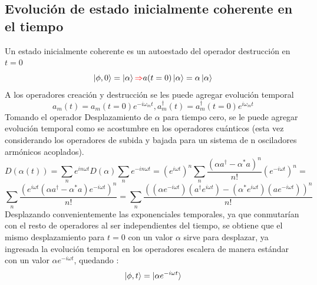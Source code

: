\documentclass{book}
\begin{document}
    \subsection{Evolución de estado inicialmente coherente en el tiempo} Un estado inicialmente coherente es un autoestado del operador destrucción en ${t=0}$
    \begin{equation}{ \ket{\phi,0}=\ket{\alpha} \textcolor{red}{\Rightarrow} a(t=0)\ket{\alpha}=\alpha\ket{\alpha} }\end{equation} A los operadores creación y destrucción se les puede agregar evolución temporal
    \begin{equation}{ a_m(t)=a_m(t=0)e^{-i\omega_m t}, a_m^\dag(t)=a_m^\dag(t=0)e^{i\omega_m t}} \end{equation} Tomando el operador Desplazamiento de ${\alpha}$ para tiempo cero, se le puede agregar evolución temporal como se acostumbre en los operadores cuánticos (esta vez considerando los operadores de subida y bajada para un sistema de n osciladores armónicos acoplados).
    \begin{equation}{ D(\alpha(t))=\sum_ne^{in\omega t}D(\alpha)\sum_n e^{-in\omega t}= (e^{i\omega t})^n\sum_n\frac{(\alpha a^\dag-\alpha^* a)^n}{n!}(e^{-i\omega t})^n=} \end{equation}
    \begin{equation}{\sum_n\frac{(e^{i\omega t}(\alpha a^\dag-\alpha^* a)e^{-i\omega t})^n}{n!}=\sum_n\frac{((\alpha e^{-i\omega t})(a^\dag e^{i\omega t})-(\alpha^*e^{i\omega t})(ae^{-i\omega t}))^n}{n!}} \end{equation} Desplazando convenientemente las exponenciales temporales, ya que conmutarían con el resto de operadores al ser independientes del tiempo, se obtiene que el mismo desplazamiento para ${t=0}$ con un valor ${\alpha}$ sirve para desplazar, ya ingresada la evolución temporal en los operadores escalera de manera estándar con un valor ${\alpha e^{-i\omega t}}$, quedando
    :
    \begin{equation}{ \ket{\phi,t}=\ket{\alpha e^{-i\omega t}} }\end{equation}
\end{document}
